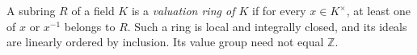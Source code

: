 
A subring $R$ of a field $K$ is a \emph{valuation ring of $K$} if for every $x\in K^\times$, at least one of $x$ or $x^{-1}$ belongs to $R$. Such a ring is local and integrally closed, and its ideals are linearly ordered by inclusion. Its value group need not equal $\mathbb Z$.
